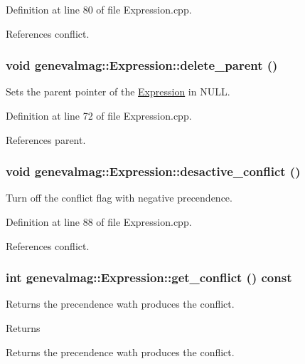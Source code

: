 Definition at line 80 of file Expression.cpp.



References conflict.

\hypertarget{classgenevalmag_1_1Expression_abfc415a5ddd5ae05b1e9610a2f347203}{
\subsubsection[{delete\_\-parent}]{\setlength{\rightskip}{0pt plus 5cm}void genevalmag::Expression::delete\_\-parent ()}}
\label{classgenevalmag_1_1Expression_abfc415a5ddd5ae05b1e9610a2f347203}
Sets the parent pointer of the \hyperlink{classgenevalmag_1_1Expression}{Expression} in NULL. 

Definition at line 72 of file Expression.cpp.



References parent.

\hypertarget{classgenevalmag_1_1Expression_aa851daf99e3e04b3cf2bb2c7d53811f8}{
\subsubsection[{desactive\_\-conflict}]{\setlength{\rightskip}{0pt plus 5cm}void genevalmag::Expression::desactive\_\-conflict ()}}
\label{classgenevalmag_1_1Expression_aa851daf99e3e04b3cf2bb2c7d53811f8}
Turn off the conflict flag with negative precendence. 

Definition at line 88 of file Expression.cpp.



References conflict.

\hypertarget{classgenevalmag_1_1Expression_afeaeebdfea5e8422299d152f8334034a}{
\subsubsection[{get\_\-conflict}]{\setlength{\rightskip}{0pt plus 5cm}int genevalmag::Expression::get\_\-conflict () const}}
\label{classgenevalmag_1_1Expression_afeaeebdfea5e8422299d152f8334034a}
Returns the precendence wath produces the conflict. \begin{DoxyReturn}{Returns}

\end{DoxyReturn}
Returns the precendence wath produces the conflict. 

